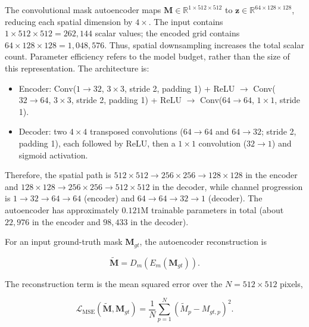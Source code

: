 \documentclass[jimaging,article,submit,pdftex,moreauthors]{Definitions/mdpi}%
\begin{document}
The convolutional mask autoencoder maps $\mathbf{M}\in\mathbb{R}^{1\times512\times512}$ to $\mathbf{z}\in\mathbb{R}^{64\times128\times128}$, reducing each spatial dimension by $4\times$. The input contains $1\times512\times512=262{,}144$ scalar values; the encoded grid contains $64\times128\times128=1{,}048{,}576$. Thus, spatial downsampling increases the total scalar count. Parameter efficiency refers to the model budget, rather than the size of this representation. The architecture is:

\begin{itemize}

  \item Encoder: Conv($1\rightarrow32$, $3\times3$, stride 2, padding 1) + ReLU $\rightarrow$ Conv($32\rightarrow64$, $3\times3$, stride 2, padding 1) + ReLU $\rightarrow$ Conv($64\rightarrow64$, $1\times1$, stride 1).

  \item Decoder: two $4\times4$ transposed convolutions ($64\rightarrow64$ and $64\rightarrow32$; stride 2, padding 1), each followed by ReLU, then a $1\times1$ convolution ($32\rightarrow1$) and sigmoid activation.

\end{itemize}



Therefore, the spatial path is $512\times512\rightarrow256\times256\rightarrow128\times128$ in the encoder and $128\times128\rightarrow256\times256\rightarrow512\times512$ in the decoder, while channel progression is $1\rightarrow32\rightarrow64\rightarrow64$ (encoder) and $64\rightarrow64\rightarrow32\rightarrow1$ (decoder). The autoencoder has approximately $0.121$M trainable parameters in total (about $22{,}976$ in the encoder and $98{,}433$ in the decoder).



For an input ground-truth mask $\mathbf{M}_{gt}$, the autoencoder reconstruction is

\begin{equation}
\tilde{\mathbf{M}}=D_m\!\left(E_m(\mathbf{M}_{gt})\right).
\end{equation}

The reconstruction term is the mean squared error over the $N=512\times512$ pixels,

\begin{equation}
\mathcal{L}_{\text{MSE}}(\tilde{\mathbf{M}},\mathbf{M}_{gt})=
\frac{1}{N}\sum_{p=1}^{N}
\left(\tilde{M}_{p}-M_{gt,p}\right)^2.
\end{equation}
\end{document}
